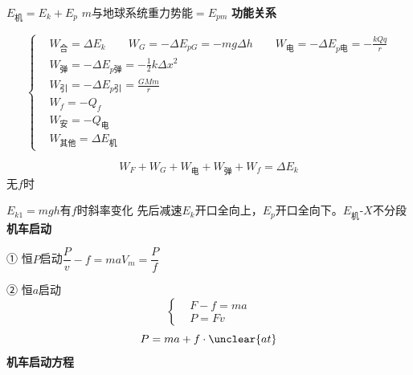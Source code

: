 $E_{\text{机}}=E_k+E_p$
$m$与地球系统重力势能$=E_{pm}$
\textbf{功能关系}

\[
\left\{\begin{aligned}
&W_{\text{合}}=\Delta E_k\qquad W_G=-\Delta E_{pG}=-mg\Delta h\qquad W_{\text{电}}=-\Delta E_{p\text{电}}=-\frac{kQq}{r}\\[6pt]
&W_{\text{弹}}=-\Delta E_{p\text{弹}}=-\frac12k\Delta x^2\\[6pt]
&W_{\text{引}}=-\Delta E_{p\text{引}}=\frac{GMm}{r} %
\\[6pt]
&W_f=-Q_f\\[6pt]
&W_{\text{安}}=-Q_{\text{电}}\\[6pt]
&W_{\text{其他}}=\Delta E_{\text{机}}
\end{aligned}\right.
\]

\[
W_F+W_G+W_{\text{电}}+W_{\text{弹}}+W_f=\Delta E_k
\]
无$f$时

$E_{k1}=mgh$\qquad\qquad 有$f$时\quad 斜率变化
先后减速\qquad $E_k$开口全向上，$E_p$开口全向下。$E_{\text{机}}$-$X$不分段 %
\textbf{机车启动}

① 恒$P$启动\qquad $\dfrac{P}{v}-f=ma$\qquad $V_m=\dfrac{P}{f}$

② 恒$a$启动
\[
\left\{\begin{aligned}
&F-f=ma\\
&P=Fv
\end{aligned}\right.
\]
\[
P=ma+f\cdot\unclear{at}
\]
\textbf{机车启动方程}

